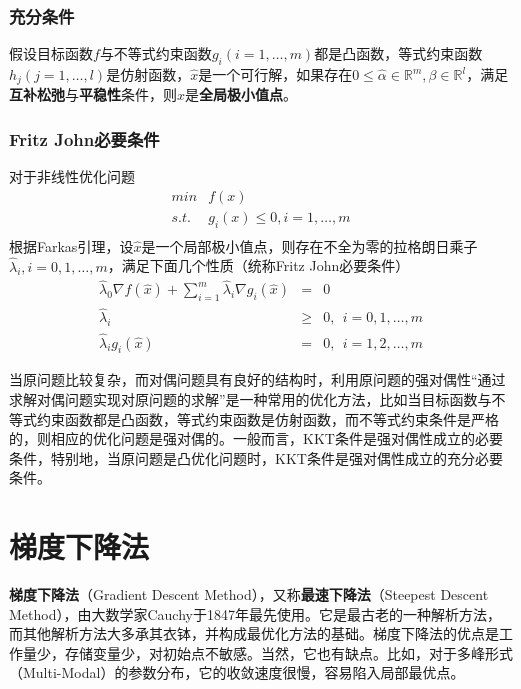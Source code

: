 \subsubsection{充分条件}
假设目标函数$f$与不等式约束函数$g_i(i=1,\ldots,m)$都是凸函数，等式约束函数$h_j(j=1,\ldots,l)$是仿射函数，$\hat x$是一个可行解，如果存在$0\le \hat\alpha \in \mathbb{R}^m,\beta\in \mathbb{R}^l$，满足\textbf{互补松弛}与\textbf{平稳性}条件，则$\hat x$是\textbf{全局极小值点}。

\subsubsection{Fritz John必要条件}
对于非线性优化问题
\begin{equation}
    \begin{array}{lll}
      \textit{min} & f(x) \\
      \textit{s.t.} & g_i(x) \le 0, i = 1, \ldots, m\\
    \end{array}
\end{equation}
根据Farkas引理，设$\hat x$是一个局部极小值点，则存在不全为零的拉格朗日乘子$\hat \lambda_i,i=0,1,\ldots,m$，满足下面几个性质（统称Fritz John必要条件）
\begin{equation}\label{eq:fritzjohn}
    \begin{array}{rcl}
      \hat \lambda_0 \nabla f(\hat x) + \sum\limits_{i=1}^m \hat\lambda_i \nabla g_i(\hat x) &=& 0 \\
      \hat \lambda_i &\ge& 0,~~i = 0,1,\ldots,m \\
      \hat \lambda_i g_i(\hat x) &=& 0,~~i = 1,2,\ldots,m
    \end{array}
\end{equation}

当原问题比较复杂，而对偶问题具有良好的结构时，利用原问题的强对偶性“通过求解对偶问题实现对原问题的求解”是一种常用的优化方法，比如当目标函数与不等式约束函数都是凸函数，等式约束函数是仿射函数，而不等式约束条件是严格的，则相应的优化问题是强对偶的。一般而言，KKT条件是强对偶性成立的必要条件，特别地，当原问题是凸优化问题时，KKT条件是强对偶性成立的充分必要条件。

\section{梯度下降法}
\textbf{梯度下降法}（Gradient Descent Method），又称\textbf{最速下降法}（Steepest Descent Method），由大数学家Cauchy于1847年最先使用。它是最古老的一种解析方法，而其他解析方法大多承其衣钵，并构成最优化方法的基础。梯度下降法的优点是工作量少，存储变量少，对初始点不敏感。当然，它也有缺点。比如，对于多峰形式（Multi-Modal）的参数分布，它的收敛速度很慢，容易陷入局部最优点。

